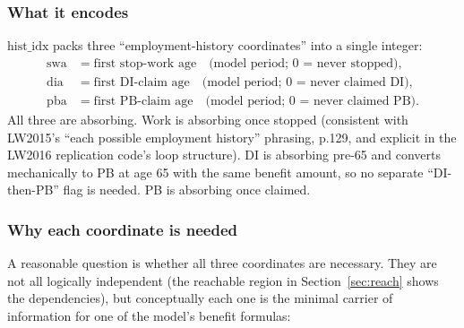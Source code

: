 \subsubsection{What it encodes}

$\text{hist\_idx}$ packs three ``employment-history coordinates'' into a single integer:
\begin{align*}
 \text{swa} &\;=\;\text{first stop-work age}\quad\text{(model period; 0 = never stopped),}\\
 \text{dia} &\;=\;\text{first DI-claim age}\quad\text{(model period; 0 = never claimed DI),}\\
 \text{pba} &\;=\;\text{first PB-claim age}\quad\text{(model period; 0 = never claimed PB).}
\end{align*}
All three are absorbing. Work is absorbing once stopped (consistent with LW2015's ``each possible employment history'' phrasing, p.129, and explicit in the LW2016 replication code's loop structure). DI is absorbing pre-65 and converts mechanically to PB at age 65 with the same benefit amount, so no separate ``DI-then-PB'' flag is needed. PB is absorbing once claimed.

\subsubsection{Why each coordinate is needed}

A reasonable question is whether all three coordinates are necessary. They are not all logically independent (the reachable region in Section~\ref{sec:reach} shows the dependencies), but conceptually each one is the minimal carrier of information for one of the model's benefit formulas:

